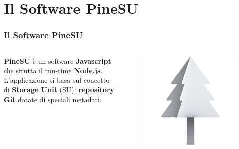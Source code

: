 \documentclass{beamer}
\begin{document}
\section{Il Software PineSU}
\begin{frame}
	\frametitle{Il Software PineSU}
	\begin{columns}
		\textbf{PineSU} è un software \textbf{Javascript} che sfrutta il run-time \textbf{Node.js}. \\
		\smallskip
		L'applicazione si basa sul concetto di
		\textbf{Storage Unit} (SU): \textbf{repository Git} dotate di speciali metadati. \\
		\centering
		\begin{figure}
			\includegraphics[width=\textwidth]{figures/favicon.png}
		\end{figure} 
	\end{columns}
\end{frame}
\end{document}
